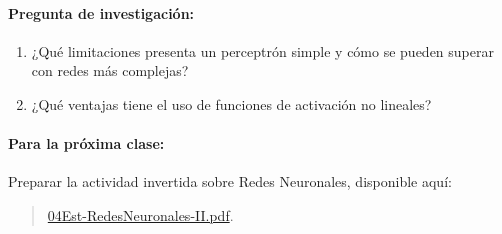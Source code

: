 \documentclass[a4,11pt]{aleph-notas}
\begin{document}
\paragraph{Pregunta de investigación:}  
\begin{enumerate}[leftmargin=*]
    \item ¿Qué limitaciones presenta un perceptrón simple y cómo se pueden superar con redes más complejas?
    \item ¿Qué ventajas tiene el uso de funciones de activación no lineales?
\end{enumerate}

\paragraph{Para la próxima clase:}  
Preparar la actividad invertida sobre Redes Neuronales, disponible aquí:  
\begin{quote}  
    \href{https://andres-merino.github.io/AprendizajeAutomaticoInicial-05-N0105/2-ClaseInvertida/04Est-RedesNeuronales-II.pdf}{04Est-RedesNeuronales-II.pdf}.  
\end{quote}  
\end{document}
